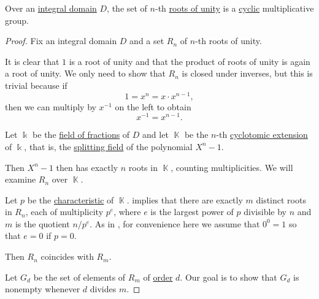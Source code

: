 \begin{proposition}\label{thm:roots_of_unity_cyclic_group}
  Over an \hyperref[def:integral_domain]{integral domain} \( D \), the set of \( n \)-th \hyperref[def:root_of_unity]{roots of unity} is a \hyperref[def:cyclic_group]{cyclic} multiplicative group.
\end{proposition}
\begin{proof}
  Fix an integral domain \( D \) and a set \( R_n \) of \( n \)-th roots of unity.

   It is clear that \( 1 \) is a root of unity and that the product of roots of unity is again a root of unity. We only need to show that \( R_n \) is closed under inverses, but this is trivial because if
  \begin{equation*}
    1 = x^n = x \cdot x^{n-1},
  \end{equation*}
  then we can multiply by \( x^{-1} \) on the left to obtain
  \begin{equation*}
    x^{-1} = x^{n-1}.
  \end{equation*}

    Let \( \Bbbk \) be the \hyperref[def:field_of_fractions]{field of fractions} of \( D \) and let \( \BbbK \) be the \( n \)-th \hyperref[def:cyclotomic_extension]{cyclotomic extension} of \( \Bbbk \), that is, the \hyperref[def:splitting_field]{splitting field} of the polynomial \( X^n - 1 \).

  Then \( X^n - 1 \) then has exactly \( n \) roots in \( \BbbK \), counting multiplicities. We will examine \( R_n \) over \( \BbbK \).

  Let \( p \) be the \hyperref[def:ring_characteristic]{characteristic} of \( \BbbK \).  implies that there are exactly \( m \) distinct roots in \( R_n \), each of multiplicity \( p^e \), where \( e \) is the largest power of \( p \) divisible by \( n \) and \( m \) is the quotient \( n / p^e \). As in , for convenience here we assume that \( 0^0 = 1 \) so that \( e = 0 \) if \( p = 0 \).

  Then \( R_n \) coincides with \( R_m \).

  Let \( G_d \) be the set of elements of \( R_m \) of \hyperref[def:group_element_order]{order} \( d \). Our goal is to show that \( G_d \) is nonempty whenever \( d \) divides \( m \).


\end{proof}
